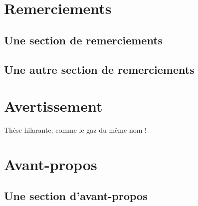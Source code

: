 \documentclass[12pt,space=onehalf,version=final]{yathesis}
\begin{document}
\makelaboratory
%
\dedication{À mon directeur bien-aimé !}
\dedication{À mon co-directeur bien-co-aimé aussi !}
\dedication{Je dédie également ce travail\\à tous ceux qui le méritent}
\makededications
%
\makefrontepigraphs
%
\begin{abstract}
  \lipsum[1-2]
\end{abstract}
\begin{abstract}
  \lipsum[3-4]
\end{abstract}
%
\makeabstract
%
\chapter{Remerciements}
\section{Une section de remerciements}
\lipsum[1]
\section{Une autre section de remerciements}
\lipsum[2-9]
%
\chapter{Avertissement}
Thèse hilarante, comme le gaz du même nom !
%
\printacronyms
%
\printsymbols
%
\chapter{Avant-propos}
\section{Une section d'avant-propos}
\lipsum[30-45]
\end{document}
